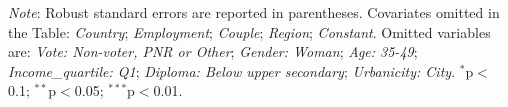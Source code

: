 \begin{table}[h]
    \caption[Correlates of support for global redistribution]{Correlates of support for global redistribution (multivariate OLS regressions). %
    } \label{tab:determinant}
    \makebox[\textwidth][c]{
\resizebox*{!}{.73\textheight}{ %
        
        }
    }
    {\footnotesize \textit{Note}: Robust standard errors are reported in parentheses. Covariates omitted in the Table: \textit{Country}; \textit{Employment}; \textit{Couple}; \textit{Region}; \textit{Constant}. Omitted variables are: \textit{Vote: Non-voter, PNR or Other}; \textit{Gender: Woman}; \textit{Age: 35-49}; \textit{Income\_quartile: Q1}; \textit{Diploma: Below upper secondary}; \textit{Urbanicity: City}. \hfill $^{*}$p$<$0.1; $^{**}$p$<$0.05; $^{***}$p$<$0.01.
    }
\end{table}

%         
    



